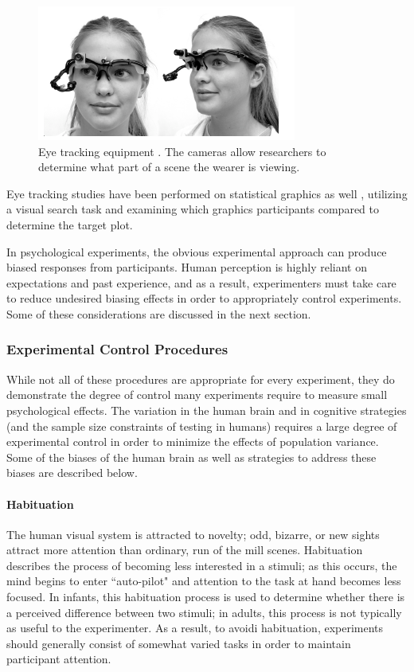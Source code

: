 \documentclass[11pt]{isuthesis}\usepackage[]{graphicx}\usepackage[]{color}
\begin{document}
\begin{figure}[htbp]\centering
\includegraphics[width=.4\textwidth]{EyeTrackingGear}
\caption[Eye Tracking Equipment]{Eye tracking equipment \protect\citep{babcock2004building}. The cameras allow researchers to determine what part of a scene the wearer is viewing.}\label{fig:eyetracking}
\end{figure}

Eye tracking studies have been performed on statistical graphics as well \citep{zhao2013mind}, utilizing a visual search task and examining which graphics participants compared to determine the target plot.

In psychological experiments, the obvious experimental approach can produce biased responses from participants. Human perception is highly reliant on expectations and past experience, and as a result, experimenters must take care to reduce undesired biasing effects in order to appropriately control experiments. Some of these considerations are discussed in the next section. 
\subsubsection{Experimental Control Procedures}
While not all of these procedures are appropriate for every experiment, they do demonstrate the degree of control many experiments require to measure small psychological effects. The variation in the human brain and in cognitive strategies (and the sample size constraints of testing in humans) requires a large degree of experimental control in order to minimize the effects of population variance. Some of the biases of the human brain as well as strategies to address these biases are described below.

\paragraph{Habituation} The human visual system is attracted to novelty; odd, bizarre, or new sights attract more attention than ordinary, run of the mill scenes. Habituation describes the process of becoming less interested in a stimuli; as this occurs, the mind begins to enter ``auto-pilot" and attention to the task at hand becomes less focused. In infants, this habituation process is used to determine whether there is a perceived difference between two stimuli; in adults, this process is not typically as useful to the experimenter. As a result, to avoidi habituation, experiments should generally consist of somewhat varied tasks in order to maintain participant attention. 
\end{document}
